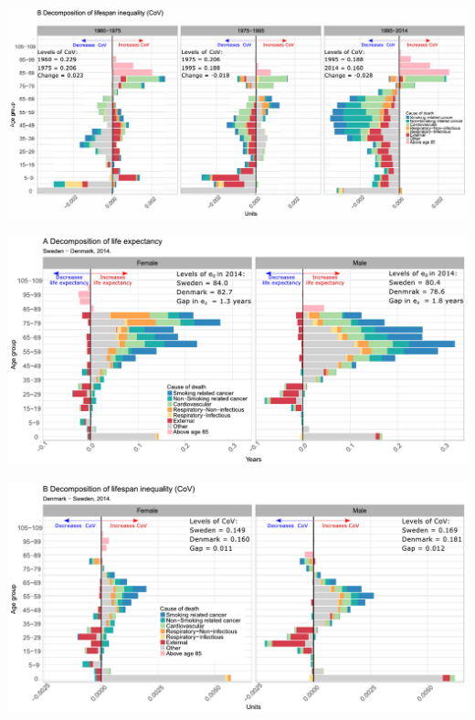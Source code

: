 \documentclass[xcolor={dvipsnames}]{beamer}
\begin{document}
\begin{frame}
\hspace*{-.4in}
		\includegraphics[scale=.41]{Figures/Figure_2_2}	
\end{frame}


\begin{frame}

\begin{center}
\hspace*{-.4in}
	\includegraphics[scale=.5]{Figures/Figure_3_1}	
	\end{center}

\end{frame}

\begin{frame}
\begin{center}
\hspace*{-.4in}
	\includegraphics[scale=.5]{Figures/Figure_3_2}	
	\end{center}

\end{frame}
\end{document}
